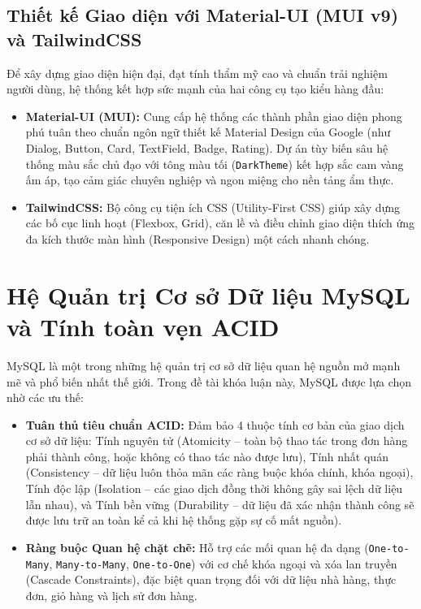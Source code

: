 \documentclass{uetgraduation}
\begin{document}
\subsection{Thiết kế Giao diện với Material-UI (MUI v9) và TailwindCSS}
Để xây dựng giao diện hiện đại, đạt tính thẩm mỹ cao và chuẩn trải nghiệm người dùng, hệ thống kết hợp sức mạnh của hai công cụ tạo kiểu hàng đầu:
\begin{itemize}
    \item \textbf{Material-UI (MUI):} Cung cấp hệ thống các thành phần giao diện phong phú tuân theo chuẩn ngôn ngữ thiết kế Material Design của Google (như Dialog, Button, Card, TextField, Badge, Rating). Dự án tùy biến sâu hệ thống màu sắc chủ đạo với tông màu tối (\texttt{DarkTheme}) kết hợp sắc cam vàng ấm áp, tạo cảm giác chuyên nghiệp và ngon miệng cho nền tảng ẩm thực.
    \item \textbf{TailwindCSS:} Bộ công cụ tiện ích CSS (Utility-First CSS) giúp xây dựng các bố cục linh hoạt (Flexbox, Grid), căn lề và điều chỉnh giao diện thích ứng đa kích thước màn hình (Responsive Design) một cách nhanh chóng.
\end{itemize}

\section{Hệ Quản trị Cơ sở Dữ liệu MySQL và Tính toàn vẹn ACID}
MySQL là một trong những hệ quản trị cơ sở dữ liệu quan hệ nguồn mở mạnh mẽ và phổ biến nhất thế giới. Trong đề tài khóa luận này, MySQL được lựa chọn nhờ các ưu thế:
\begin{itemize}
    \item \textbf{Tuân thủ tiêu chuẩn ACID:} Đảm bảo 4 thuộc tính cơ bản của giao dịch cơ sở dữ liệu: Tính nguyên tử (Atomicity -- toàn bộ thao tác trong đơn hàng phải thành công, hoặc không có thao tác nào được lưu), Tính nhất quán (Consistency -- dữ liệu luôn thỏa mãn các ràng buộc khóa chính, khóa ngoại), Tính độc lập (Isolation -- các giao dịch đồng thời không gây sai lệch dữ liệu lẫn nhau), và Tính bền vững (Durability -- dữ liệu đã xác nhận thành công sẽ được lưu trữ an toàn kể cả khi hệ thống gặp sự cố mất nguồn).
    \item \textbf{Ràng buộc Quan hệ chặt chẽ:} Hỗ trợ các mối quan hệ đa dạng (\texttt{One-to-Many}, \texttt{Many-to-Many}, \texttt{One-to-One}) với cơ chế khóa ngoại và xóa lan truyền (Cascade Constraints), đặc biệt quan trọng đối với dữ liệu nhà hàng, thực đơn, giỏ hàng và lịch sử đơn hàng.
\end{itemize}
\end{document}
